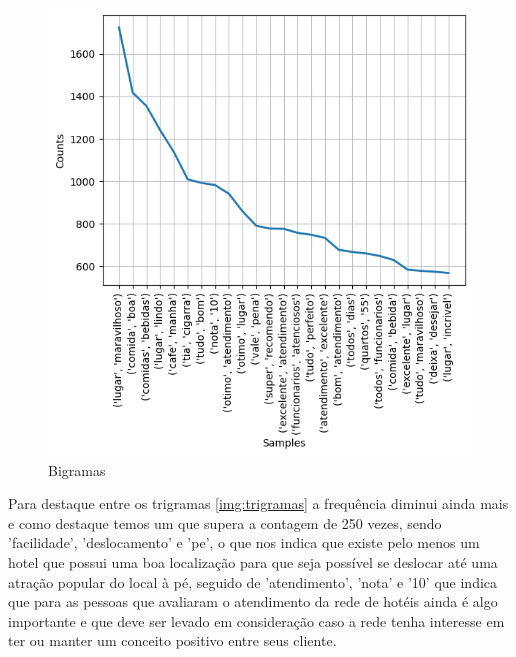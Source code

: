 \begin{figure}[!h]
	\centering
	\includegraphics[width=.8\textwidth]{figs/exploratoria/bigramas.png}
	\caption{Bigramas}
	\label{img:bigramas}
\end{figure}

Para destaque entre os trigramas \ref{img:trigramas} a frequência diminui ainda mais e como destaque temos um que supera a contagem de 250 vezes, sendo 'facilidade', 'deslocamento' e 'pe', o que nos indica que existe pelo menos um hotel que possui uma boa localização para que seja possível se deslocar até uma atração popular do local à pé, seguido de 'atendimento', 'nota' e '10' que indica que para as pessoas que avaliaram o atendimento da rede de hotéis ainda é algo importante e que deve ser levado em consideração caso a rede tenha interesse em ter ou manter um conceito positivo entre seus cliente.

